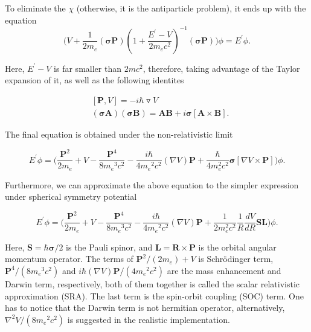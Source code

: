 \documentclass[a4paper, 12pt, titlepage,oneside,drop]{kthesis}
\begin{document}
\noindent To eliminate the $\chi$ (otherwise, it is the antiparticle problem), it ends up with the equation
  \begin{equation}\label{soc1212}
\Big(V + \frac{1}{2m_e} (\boldsymbol{\sigma} \textbf{P}) (1+\frac{E^{\prime}-V}{2m_ec^2})^{-1} (\boldsymbol{\sigma} \textbf{P}) \Big)\phi=E^{\prime}\phi.
\end{equation}

\noindent Here, ${E^{\prime}-V}$ is far smaller than ${2mc^2}$, therefore, taking advantage of the Taylor expansion of it,  as well as the following identites

\begin{equation}
\begin{split}
& [\textbf{P}, V ] = -i \hbar \triangledown V \\                
&(\boldsymbol{\sigma} \textbf{A} )(\boldsymbol{\sigma} \textbf{B}) = \textbf{A} \textbf{B} + i\boldsymbol{\sigma}[\textbf{A} \times \textbf{B}].
\end{split}
\end{equation}

The final equation is obtained under the non-relativistic limit

\begin{equation}\label{nonrela1}
E^{\prime} \phi = \Big(\frac{\textbf{P}^2}{2m_e} + V - \frac{\textbf{P}^4}{8 {m_e}^3 {c}^2}-\frac{i\hbar}{4{m_e}^2 {c}^2} (\nabla{V})\textbf{P}+\frac{\hbar}{4 m_e^2 c^2} \boldsymbol{\sigma}[\nabla{V} \times \textbf{P}]\Big) \phi.
\end{equation}

Furthermore, we can approximate the above equation to the simpler expression under spherical symmetry potential

\begin{equation}
 E^{\prime} \phi = \Big(\frac{\textbf{P}^2}{2m_e} +V - \frac{\textbf{P}^4}{8 {m_e}^3 {c}^2}-\frac{i\hbar}{4{m_e}^2 {c}^2} (\nabla{V})\textbf{P}+\frac{1}{2 m_e^2 c^2} \frac{1}{R} \frac{dV}{dR}\textbf{S}\textbf{L}\Big) \phi.
\end{equation}

\noindent Here, $\textbf{S} = {\hbar}{\boldsymbol{\sigma}}/2$ is the Pauli spinor, and $\textbf{L} = \textbf{R} \times \textbf{P}$ is the orbital
angular momentum operator. The terms of ${\textbf{P}^2}/(2m_e) + V$ is Schrödinger term,  ${\textbf{P}^4}/(8 {m_e}^3 {c}^2)$ and ${i\hbar} (\nabla{V})\textbf{P} /(4{m_e}^2 {c}^2)$  are the mass enhancement 
and Darwin term, respectively, both of them together is called the scalar relativistic approximation (SRA). The last term is the spin-orbit coupling (SOC) term. One has to
notice that the Darwin term is not hermitian operator, alternatively, $\nabla^2{V} /(8{m_e}^2 {c}^2)$ is suggested in the realistic implementation.
\end{document}
